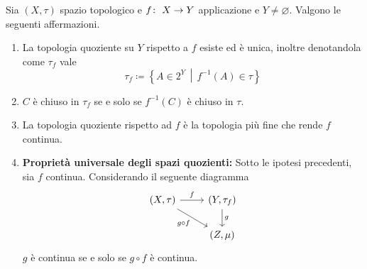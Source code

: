 \begin{theorem}
	Sia $(X, \tau)$ spazio topologico e $f \colon\ X \rightarrow Y$ applicazione e $Y \neq \varnothing$. Valgono le seguenti affermazioni.
	
	
	
	
	\begin{enumerate}
		\item La topologia quoziente su $Y$ rispetto a $f$ esiste ed è unica, inoltre denotandola come $\tau_f$ vale 
		\begin{equation*}
			\tau_f \coloneqq \left\{ A \in 2^Y \,\middle|\, f^{-1}(A) \in \tau \right\}
		\end{equation*}
		\item $C$ è chiuso in $\tau_f$ se e solo se $f^{-1}(C)$ è chiuso in $\tau$.
		\item La topologia quoziente rispetto ad $f$ è la topologia più fine che rende $f$ continua.
		\item \textbf{Proprietà universale degli  spazi quozienti:} Sotto le ipotesi precedenti, sia $f$ continua. Considerando il seguente diagramma 
		\begin{equation*}
		\begin{tikzcd}
		(X, \tau) \arrow[swap]{rd}{g\circ f} \arrow{r}{f} & (Y, \tau_f) \arrow{d}{g} \\
		& (Z, \mu) 
		\end{tikzcd}
		\end{equation*}
		$g$ è continua se e solo se $g \circ f$ è continua. 
	\end{enumerate}
\end{theorem}
